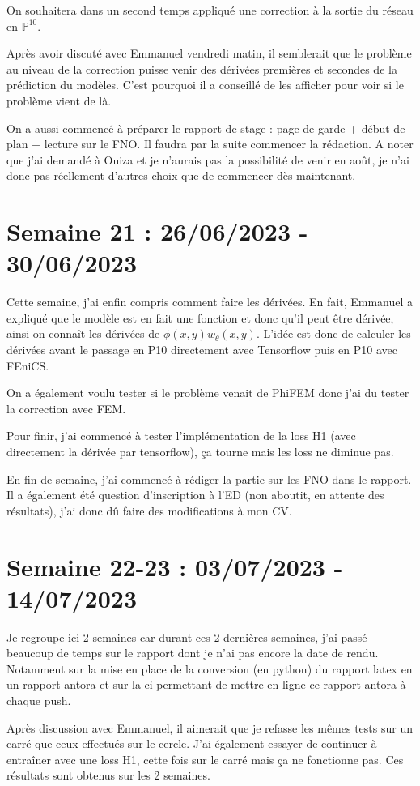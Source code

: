 \documentclass[french]{article}
\begin{document}
	On souhaitera dans un second temps appliqué une correction à la sortie du réseau en $\mathbb{P}^{10}$. 
	
	Après avoir discuté avec Emmanuel vendredi matin, il semblerait que le problème au niveau de la correction puisse venir des dérivées premières et secondes de la prédiction du modèles. C'est pourquoi il a conseillé de les afficher pour voir si le problème vient de là.
	
	On a aussi commencé à préparer le rapport de stage : page de garde + début de plan + lecture sur le FNO. Il faudra par la suite commencer la rédaction. A noter que j'ai demandé à Ouiza et je n'aurais pas la possibilité de venir en août, je n'ai donc pas réellement d'autres choix que de commencer dès maintenant.
\section{Semaine 21 : 26/06/2023 - 30/06/2023}
	Cette semaine, j'ai enfin compris comment faire les dérivées. En fait, Emmanuel a expliqué que le modèle est en fait une fonction et donc qu'il peut être dérivée, ainsi on connaît les dérivées de $\phi(x,y)w_\theta(x,y)$. 
	L'idée est donc de calculer les dérivées avant le passage en P10 directement avec Tensorflow puis en P10 avec FEniCS.
	
	On a également voulu tester si le problème venait de PhiFEM donc j'ai du tester la correction avec FEM.
	
	Pour finir, j'ai commencé à tester l'implémentation de la loss H1 (avec directement la dérivée par tensorflow), ça tourne mais les loss ne diminue pas.
	
	En fin de semaine, j'ai commencé à rédiger la partie sur les FNO dans le rapport. Il a également été question d'inscription à l'ED (non aboutit, en attente des résultats), j'ai donc dû faire des modifications à mon CV.
\section{Semaine 22-23 : 03/07/2023 - 14/07/2023}
	Je regroupe ici 2 semaines car durant ces 2 dernières semaines, j'ai passé beaucoup de temps sur le rapport dont je n'ai pas encore la date de rendu. Notamment sur la mise en place de la conversion (en python) du rapport latex en un rapport antora et sur la ci permettant de mettre en ligne ce rapport antora à chaque push.
	  
	Après discussion avec Emmanuel, il aimerait que je refasse les mêmes tests sur un carré que ceux effectués sur le cercle. J'ai également essayer de continuer à entraîner avec une loss H1, cette fois sur le carré mais ça ne fonctionne pas. Ces résultats sont obtenus sur les 2 semaines.
\end{document}
